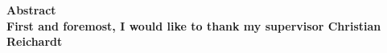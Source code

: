 \bfseries{Abstract}\mdseries\\                                                                                                
                                                                                                                             

First and foremost, I would like to thank my supervisor Christian Reichardt  
  
                                                                                                                                   
\vspace{4.0cm}                                                                                                                                  
                                                                                                                                                
                                                                                                                                                

